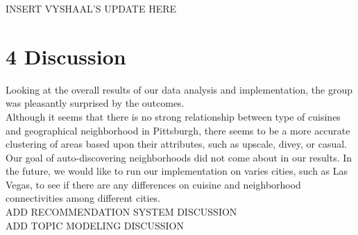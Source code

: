 \documentclass{neu_handout}
\begin{document}
INSERT VYSHAAL'S UPDATE HERE	


\section*{4 Discussion}

Looking at the overall results of our data analysis and implementation, the group was pleasantly surprised by the
outcomes.\\
Although it seems that there is no strong relationship between type of cuisines and geographical neighborhood in Pittsburgh, there seems to be a more accurate clustering of areas based upon their attributes, such as upscale, divey, or casual. Our goal of auto-discovering neighborhoods did not come about in our results. In the future, we would like to run our implementation on varies cities, such as Las Vegas, to see if there are any differences on
cuisine and neighborhood connectivities among different cities.\\

ADD RECOMMENDATION SYSTEM DISCUSSION\\

ADD TOPIC MODELING DISCUSSION
\end{document}
